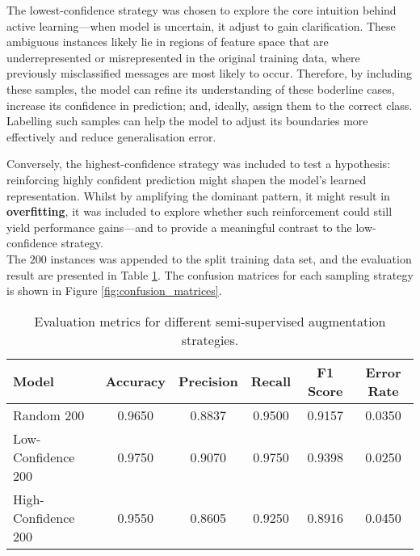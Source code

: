 \documentclass[a4paper,12pt]{article}
\begin{document}
The lowest-confidence strategy was chosen to explore the core intuition behind active learning—when model is uncertain, it adjust to gain clarification. These ambiguous instances likely lie in regions of feature space that are underrepresented or misrepresented in the original training data, where previously misclassified messages are most likely to occur. Therefore, by including these samples, the model can refine its understanding of these boderline cases, increase its confidence in prediction; and, ideally, assign them to the correct class. Labelling such samples can help the model to adjust its boundaries more effectively and reduce generalisation error.

Conversely, the highest-confidence strategy was included to test a hypothesis: reinforcing highly confident prediction might shapen the model's learned representation. Whilst by amplifying the dominant pattern, it might result in \textbf{overfitting}, it was included to explore whether such reinforcement could still yield performance gains—and to provide a meaningful contrast to the low-confidence strategy. \\

The $200$ instances was appended to the split training data set, and the evaluation result are presented in Table \ref{tab:evaluation-metrics}. The confusion matrices for each sampling strategy is shown in Figure \ref{fig:confusion_matrices}.

\begin{table}[h!]
\centering
\begin{tabular}{lccccc}
\hline
\textbf{Model} & \textbf{Accuracy} & \textbf{Precision} & \textbf{Recall} & \textbf{F1 Score} & \textbf{Error Rate} \\
\hline
Random 200         & 0.9650 & 0.8837 & 0.9500 & 0.9157 & 0.0350 \\
Low-Confidence 200 & 0.9750 & 0.9070 & 0.9750 & 0.9398 & 0.0250 \\
High-Confidence 200& 0.9550 & 0.8605 & 0.9250 & 0.8916 & 0.0450 \\
\hline
\end{tabular}
\caption{Evaluation metrics for different semi-supervised augmentation strategies.}
\label{tab:evaluation-metrics}
\end{table}
\end{document}
